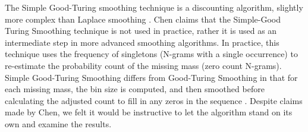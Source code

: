 \documentclass[ai15_group61_report.tex]{subfiles}
\begin{document}
The Simple Good-Turing smoothing technique is a discounting algorithm, slightly more complex than Laplace smoothing \cite{Jurafsky2000}. Chen\cite{chen-smoothing} claims that the Simple-Good Turing Smoothing technique is not used in practice, rather it is used as an intermediate step in more advanced smoothing algorithms. In practice, this technique uses the frequency of singletons (N-grams with a single occurrence) to re-estimate the probability count of the missing mass (zero count N-grams). Simple Good-Turing Smoothing differs from Good-Turing Smoothing in that for each missing mass, the bin size is computed, and then smoothed before calculating the adjusted count to fill in any zeros in the sequence \cite{Jurafsky2000}. Despite claims made by Chen, we felt it would be instructive to let the algorithm stand on its own and examine the results.
\end{document}
